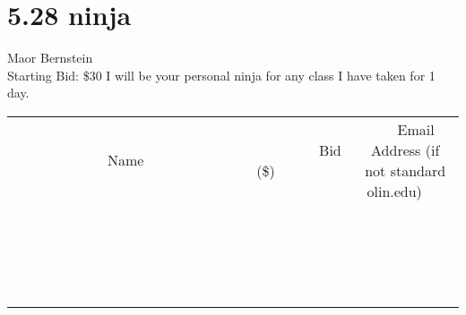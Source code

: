 \documentclass[11pt]{article}
\begin{document}
\section*{5.28 ninja}
Maor Bernstein
\\
Starting Bid: \$30
\newline
I will be your personal ninja for any class I have taken for 1 day.
\\[3ex]
\begin{tabular}{c c c}
~~~~~~~~~~~~~Name~~~~~~~~~~~~~ & ~~~~~~~~~Bid (\$)~~~~~~~~~  & ~~~Email Address (if not standard olin.edu)~~~\\
 & & \\
\hline
 & & \\
\hline
 & & \\
\hline
 & & \\
\hline
 & & \\
\hline
 & & \\
\hline
 & & \\
\hline
 & & \\
\hline
 & & \\
\hline
 & & \\
\hline
 & & \\
\hline
 & & \\
\hline
 & & \\
\hline
 & & \\
\hline
 & & \\
\hline
 & & \\
\hline
 & & \\
\hline
 & & \\
\hline
 & & \\
\hline
\end{tabular}
\newpage
\end{document}
